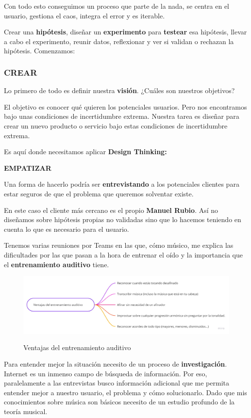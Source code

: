 \documentclass[12pt,twoside,titlepage]{report}
\begin{document}
Con todo esto conseguimos un proceso que parte de la nada, se centra en el usuario, gestiona el caos, integra el error y es iterable.

Crear una \textbf{hipótesis}, diseñar un \textbf{experimento} para \textbf{testear} esa hipótesis, llevar a cabo el experimento, reunir datos, reflexionar y ver si validan o rechazan la hipótesis. Comenzamos:

\subsubsection{CREAR}

Lo primero de todo es definir nuestra \textbf{visión}. ¿Cuáles son nuestros objetivos?

El objetivo es conocer qué quieren los potenciales usuarios. Pero nos encontramos bajo unas condiciones de incertidumbre extrema. Nuestra tarea es diseñar para crear un nuevo producto o servicio bajo estas condiciones de incertidumbre extrema.

Es aquí donde necesitamos aplicar \textbf{Design Thinking:}

\textbf{EMPATIZAR}

Una forma de hacerlo podría ser \textbf{entrevistando} a los potenciales clientes para estar seguros de que el problema que queremos solventar existe.

En este caso el cliente más cercano es el propio \textbf{Manuel Rubio}. Así no diseñamos sobre hipótesis propias no validadas sino que lo hacemos teniendo en cuenta lo que es necesario para el usuario.

Tenemos varias reuniones por Teams en las que, cómo músico, me explica las dificultades por las que pasan a la hora de entrenar el oído y la importancia que el \textbf{entrenamiento auditivo} tiene.

\begin{figure}[H]
    \centering
    \includegraphics[scale=0.2]{MINDMAP0}
    \label{fig:Mindmap0}
    \caption{Ventajas del entrenamiento auditivo}
\end{figure}

Para entender mejor la situación necesito de un proceso de \textbf{investigación}. Internet es un inmenso campo de búsqueda de información. Por eso, paralelamente a las entrevistas busco información adicional que me permita entender mejor a nuestro usuario, el problema y cómo solucionarlo. Dado que mis conocimientos sobre música son básicos necesito de un estudio profundo de la teoría musical. 
\end{document}
